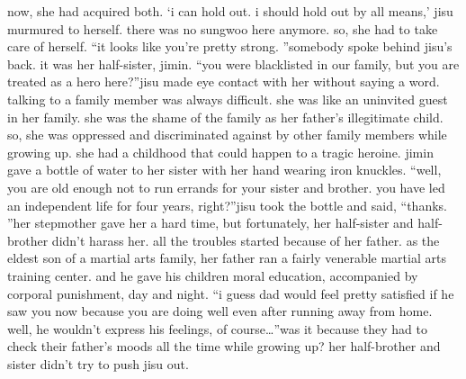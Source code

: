 now, she had acquired both.
‘i can hold out.
 i should hold out by all means,’ jisu murmured to herself.
there was no sungwoo here anymore.
 so, she had to take care of herself.
“it looks like you’re pretty strong.
”somebody spoke behind jisu’s back.
 it was her half-sister, jimin.
“you were blacklisted in our family, but you are treated as a hero here?”jisu made eye contact with her without saying a word.
talking to a family member was always difficult.
 she was like an uninvited guest in her family.
she was the shame of the family as her father’s illegitimate child.
 so, she was oppressed and discriminated against by other family members while growing up.
 she had a childhood that could happen to a tragic heroine.
jimin gave a bottle of water to her sister with her hand wearing iron knuckles.
“well, you are old enough not to run errands for your sister and brother.
 you have led an independent life for four years, right?”jisu took the bottle and said, “thanks.
”her stepmother gave her a hard time, but fortunately, her half-sister and half-brother didn’t harass her.
all the troubles started because of her father.
 as the eldest son of a martial arts family, her father ran a fairly venerable martial arts training center.
 and he gave his children moral education, accompanied by corporal punishment, day and night.
“i guess dad would feel pretty satisfied if he saw you now because you are doing well even after running away from home.
 well, he wouldn’t express his feelings, of course…”was it because they had to check their father’s moods all the time while growing up? her half-brother and sister didn’t try to push jisu out.

